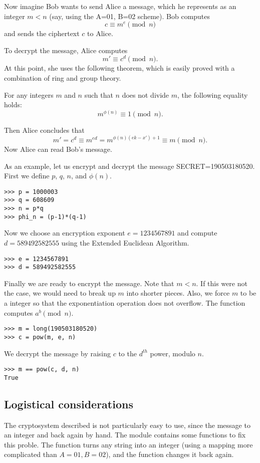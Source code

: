 Now imagine Bob wants to send Alice a message, which he represents as an integer $m<n$ (say, using the A=01, B=02 scheme).
Bob computes 
\[
c \equiv m^e \pmod{n}
\]
and sends the ciphertext $c$ to Alice.

To decrypt the message, Alice computes
\[
m' \equiv c^d \pmod{n}.
\]
At this point, she uses the following theorem, which is easily proved with a combination of ring and group theory.
\begin{theorem}
For any integers $m$ and $n$ such that $n$ does not divide $m$, the following equality holds:
\[
m^{\phi(n)}\equiv 1 \pmod{n}.
\]
\end{theorem}
Then Alice concludes that
\[
m' = c^d \equiv m^{ed} = m^{\phi(n)(ek-x')+1} \equiv m \pmod{n}.
\]
Now Alice can read Bob's message.

As an example, let us encrypt and decrypt the message SECRET=190503180520.
First we define $p$, $q$, $n$, and $\phi(n)$.
\begin{lstlisting}
>>> p = 1000003
>>> q = 608609
>>> n = p*q
>>> phi_n = (p-1)*(q-1)
\end{lstlisting}

Now we choose an encryption exponent $e = 1234567891$ and compute $d = 589492582555$ using the Extended Euclidean Algorithm.
\begin{lstlisting}
>>> e = 1234567891
>>> d = 589492582555
\end{lstlisting}

Finally we are ready to encrypt the message. 
Note that $m<n$. If this were not the case, we would need to break up $m$ into shorter pieces.
Also, we force $m$ to be a  integer so that the exponentiation operation does not overflow.
The function  computes $a^b \pmod{n}$.
\begin{lstlisting}
>>> m = long(190503180520)
>>> c = pow(m, e, n)
\end{lstlisting}

We decrypt the message by raising $c$ to the $d^{th}$ power, modulo $n$.
\begin{lstlisting}
>>> m == pow(c, d, n)
True
\end{lstlisting}

\subsection*{Logistical considerations}
The cryptosystem described is not particularly easy to use, since the message to an integer and back again by hand.
The module  contains some functions to fix this proble.
The function  turns any string into an integer (using a mapping more complicated than $A=01, B=02$), and the function  changes it back again.

